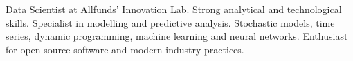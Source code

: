 

\begin{cvparagraph}

Data Scientist at Allfunds' Innovation Lab. Strong analytical and technological
skills. Specialist in modelling and predictive analysis. Stochastic models,
time series, dynamic programming, machine learning and neural networks.
Enthusiast for open source software and modern industry practices.

\end{cvparagraph}

